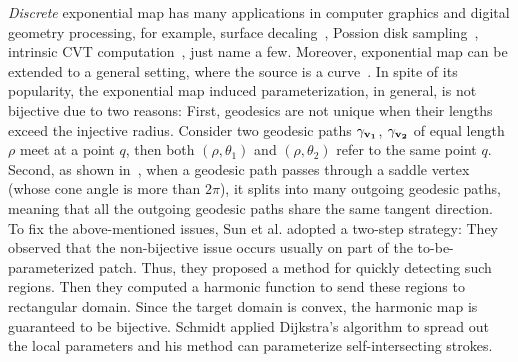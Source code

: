   \textit{Discrete} exponential map has many applications in computer graphics and digital geometry processing, for example, surface decaling~\cite{Schmidt:2006:IDC:1141911.1141930},
  Possion disk sampling~\cite{DBLP:journals/tvcg/YingXS013}, intrinsic CVT computation~\cite{DBLP:journals/cad/WangYLXWGM015}, just name a few.
  Moreover, exponential map can be extended to a general setting, where the source is a curve~\cite{Sun:2013:TBI:2448196.2448221}.
  In spite of its popularity, the exponential map induced parameterization, in general, is not bijective due to two reasons:
  First, geodesics are not unique when their lengths exceed the injective radius.
  Consider two geodesic paths $\gamma_{\bf v_1}$, $\gamma_{\bf v_2}$ of equal length $\rho$ meet at a point $q$,
  then both $(\rho,\theta_1)$ and $(\rho,\theta_2)$ refer to the same point $q$.
  Second, as shown in~\cite{Ying13SVG}, when a geodesic path passes through a saddle vertex (whose cone angle is more than $2\pi$),
  it splits into many outgoing geodesic paths, meaning that all the outgoing geodesic paths share the same tangent direction.
  To fix the above-mentioned issues, Sun et al. \cite{Sun:2013:TBI:2448196.2448221} adopted a two-step strategy:
  They observed that the non-bijective issue occurs usually on part of the to-be-parameterized patch.
  Thus, they proposed a method for quickly detecting such regions.
  Then they computed a harmonic function to send these regions to rectangular domain.
  Since the target domain is convex, the harmonic map is guaranteed to be bijective.
  Schmidt \cite{CGF:CGF12045} applied Dijkstra's algorithm to spread out the local parameters and his method can parameterize self-intersecting strokes.

